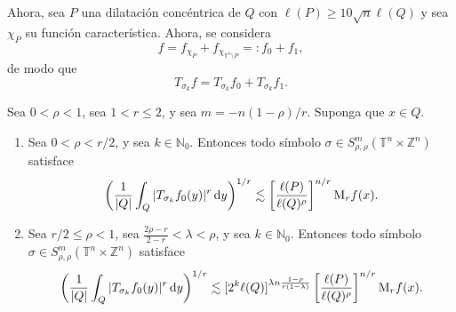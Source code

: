 Ahora, sea $P$ una dilatación concéntrica de $Q$ con $\ell(P)\geq 10\sqrt{n}\ell(Q)$ y sea $\chi_P$ su función característica. Ahora, se considera 
\begin{equation}
	f = f_{\chi_P} + f_{\chi_{\mathbb{T}^n\setminus P}} =: f_0 + f_1,
	\label{eq:decomposition}
\end{equation}
de modo que
\begin{equation*}
	T_{\sigma_k}f = T_{\sigma_k}f_0 + T_{\sigma_k}f_1.
\end{equation*}

\begin{proposition}
	Sea $0<\rho<1$, sea $1<r\leq2$, y sea $m=-n(1-\rho)/r$. Suponga que $x\in Q$.
	
	\begin{enumerate}
		\item Sea $0<\rho<r/2$, y sea $k\in\mathbb{N}_0$. Entonces todo símbolo $\sigma \in S^m_{\rho,\rho}(\mathbb{T}^n \times \mathbb{Z}^n) $ satisface
		\begin{equation}
			\left( \frac{1}{|Q|}\int_Q |T_{\sigma_k} f_0(y)|^r\mathop{}\!\mathrm{d} y  
			\right)^{1/r} \lesssim \left[ \frac{\ell(P)}{\ell(Q)^\rho} 
			\right]^{n/r} \mathrm{M}_rf(x).
			\label{eq:fo-estimate-rho-less}
		\end{equation}
		\item Sea $r/2\leq \rho <1$, sea $ \frac{2\rho - r}{2-r} < \lambda < \rho$, y sea $k\in\mathbb{N}_0$. Entonces todo símbolo $\sigma \in S^m_{\rho,\rho}(\mathbb{T}^n \times \mathbb{Z}^n) $ satisface
		\begin{equation}
			\left( \frac{1}{|Q|}\int_Q|T_{\sigma_k}f_0(y)|^r \mathop{}\!\mathrm{d} y
			\right)^{1/r} \lesssim [2^k\ell(Q)]^{\lambda n \frac{1-\rho}{r(1-\lambda)}} \left[ \frac{\ell(P)}{\ell(Q)^\rho}
			\right]^{n/r} \mathrm{M}_rf(x).
			\label{eq:f0-estimate-rho-greater}
		\end{equation}
	\end{enumerate}
	
	
	
	
\end{proposition}
